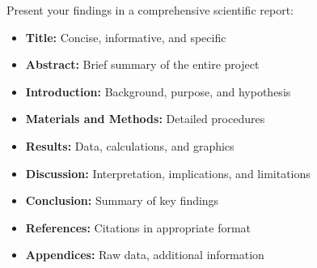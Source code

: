Present your findings in a comprehensive scientific report:
\begin{itemize}
    \item \textbf{Title:} Concise, informative, and specific
    \item \textbf{Abstract:} Brief summary of the entire project
    \item \textbf{Introduction:} Background, purpose, and hypothesis
    \item \textbf{Materials and Methods:} Detailed procedures
    \item \textbf{Results:} Data, calculations, and graphics
    \item \textbf{Discussion:} Interpretation, implications, and limitations
    \item \textbf{Conclusion:} Summary of key findings
    \item \textbf{References:} Citations in appropriate format
    \item \textbf{Appendices:} Raw data, additional information
\end{itemize}

